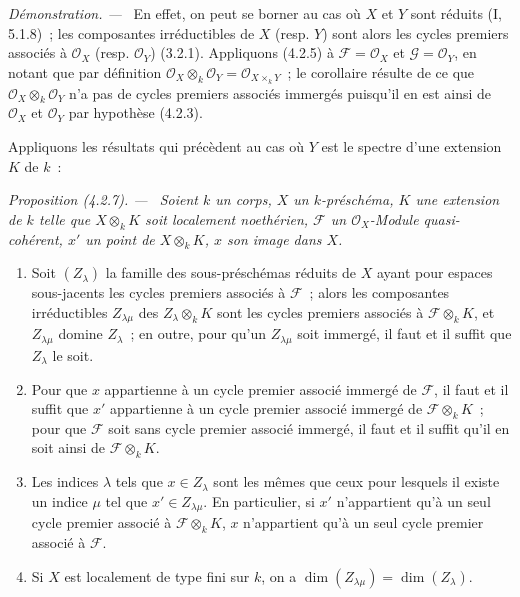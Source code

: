 \documentclass[10pt,oneside]{book}
\newcommand{\oldpage}[2][]{%
  \setcounter{footnote}{0}%
  \marginpar{\scriptsize\textbf{#1}~|~#2}\ignorespaces}
\newenvironment{proposition}[1][]{%
  \par\medskip\noindent\itshape Proposition (#1). ---\ }{\par}
\newenvironment{proof}{%
  \par\medskip\noindent\textit{Démonstration. ---\ }}{\par}
\begin{document}
\begin{proof}
En effet, on peut se borner au cas où $X$ et $Y$ sont réduits (I, 5.1.8)~; les
composantes irréductibles de $X$ (resp. $Y$) sont alors les cycles premiers
associés à $\mathcal O_X$ (resp. $\mathcal O_Y$) (3.2.1). Appliquons (4.2.5)
à $\mathcal F=\mathcal O_X$ et $\mathcal G=\mathcal O_Y$, en notant que par
définition $\mathcal O_X\otimes_k\mathcal O_Y=\mathcal O_{X\times_k Y}$~; le
corollaire résulte de ce que $\mathcal O_X\otimes_k\mathcal O_Y$ n'a pas de
cycles premiers associés immergés puisqu'il en est ainsi de $\mathcal O_X$ et
$\mathcal O_Y$ par hypothèse (4.2.3).
\end{proof}

Appliquons les résultats qui précèdent au cas où $Y$ est le spectre d'une
extension $K$ de $k$~:

\begin{proposition}[4.2.7]
\label{IV.2.4.2.7-fr}
Soient $k$ un corps, $X$ un $k$-préschéma, $K$ une extension de $k$ telle que
$X\otimes_k K$ soit localement noethérien, $\mathcal F$ un
$\mathcal O_X$-Module quasi-cohérent, $x'$ un point de $X\otimes_k K$, $x$
son image dans $X$.
\begin{enumerate}
\item[(i)] Soit $(Z_\lambda)$ la famille des sous-préschémas réduits de $X$
ayant pour espaces sous-jacents les cycles premiers associés à $\mathcal F$~;
alors les composantes irréductibles $Z_{\lambda\mu}$ des
$Z_\lambda\otimes_k K$ sont les cycles premiers associés à
$\mathcal F\otimes_k K$, et $Z_{\lambda\mu}$ domine $Z_\lambda$~; en outre,
pour qu'un $Z_{\lambda\mu}$ soit immergé, il faut et il suffit que $Z_\lambda$
le soit.
\item[(ii)] Pour que $x$ appartienne à un cycle premier associé immergé de
$\mathcal F$, il faut et il suffit que $x'$ appartienne à un cycle premier
associé immergé de $\mathcal F\otimes_k K$~; pour que $\mathcal F$ soit sans
cycle premier associé immergé, il faut et il suffit qu'il en soit ainsi de
$\mathcal F\otimes_k K$.

\oldpage[IV-2]{57}

\item[(iii)] Les indices $\lambda$ tels que $x\in Z_\lambda$ sont les mêmes
que ceux pour lesquels il existe un indice $\mu$ tel que
$x'\in Z_{\lambda\mu}$. En particulier, si $x'$ n'appartient qu'à un seul
cycle premier associé à $\mathcal F\otimes_k K$, $x$ n'appartient qu'à un
seul cycle premier associé à $\mathcal F$.
\item[(iv)] Si $X$ est localement de type fini sur $k$, on a
$\dim(Z_{\lambda\mu})=\dim(Z_\lambda)$.
\end{enumerate}
\end{proposition}
\end{document}
